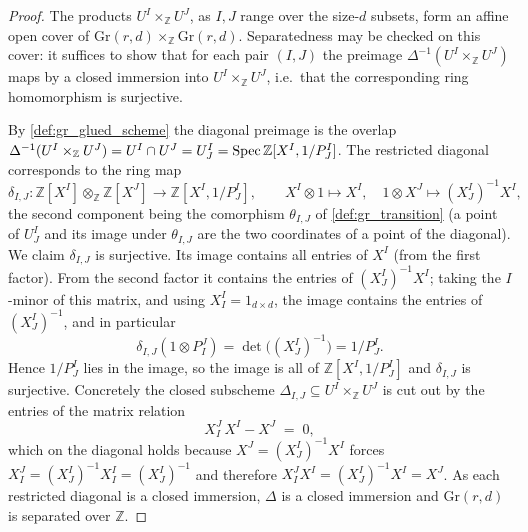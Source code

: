 \begin{proof}
  \leanok
  The products \(U^I \times_{\mathbb{Z}} U^J\), as \(I, J\) range over the
  size-\(d\) subsets, form an affine open cover of \(\mathrm{Gr}(r,d)
  \times_{\mathbb{Z}} \mathrm{Gr}(r,d)\). Separatedness may be checked on this
  cover: it suffices to show that for each pair \((I,J)\) the preimage
  \(\Delta^{-1}(U^I \times_{\mathbb{Z}} U^J)\) maps by a closed immersion into
  \(U^I \times_{\mathbb{Z}} U^J\), i.e.\ that the corresponding ring
  homomorphism is surjective.

  By \cref{def:gr_glued_scheme} the diagonal preimage is the overlap
  \(\Delta^{-1}(U^I \times_{\mathbb{Z}} U^J) = U^I \cap U^J = U^I_J = \operatorname{Spec}
  \mathbb{Z}[X^I, 1/P^I_J]\). The restricted diagonal corresponds to the ring map
  \[
    \delta_{I,J} : \mathbb{Z}[X^I] \otimes_{\mathbb{Z}} \mathbb{Z}[X^J]
    \longrightarrow \mathbb{Z}[X^I, 1/P^I_J],
    \qquad
    X^I \otimes 1 \mapsto X^I, \quad 1 \otimes X^J \mapsto (X^I_J)^{-1} X^I,
  \]
  the second component being the comorphism \(\theta_{I,J}\) of
  \cref{def:gr_transition} (a point of \(U^I_J\) and its image under
  \(\theta_{I,J}\) are the two coordinates of a point of the diagonal). We claim
  \(\delta_{I,J}\) is surjective. Its image contains all entries of \(X^I\)
  (from the first factor). From the second factor it contains the entries of
  \((X^I_J)^{-1} X^I\); taking the \(I\)-minor of this matrix, and using
  \(X^I_I = 1_{d\times d}\), the image contains the entries of \((X^I_J)^{-1}\),
  and in particular
  \[
    \delta_{I,J}(1 \otimes P^J_I) = \det\bigl((X^I_J)^{-1}\bigr) = 1/P^I_J .
  \]
  Hence \(1/P^I_J\) lies in the image, so the image is all of
  \(\mathbb{Z}[X^I, 1/P^I_J]\) and \(\delta_{I,J}\) is surjective. Concretely the
  closed subscheme \(\Delta_{I,J} \subseteq U^I \times_{\mathbb{Z}} U^J\) is cut
  out by the entries of the matrix relation
  \[
    X^J_I \, X^I - X^J \;=\; 0,
  \]
  which on the diagonal holds because \(X^J = (X^I_J)^{-1} X^I\) forces
  \(X^J_I = (X^I_J)^{-1} X^I_I = (X^I_J)^{-1}\) and therefore \(X^J_I X^I =
  (X^I_J)^{-1} X^I = X^J\). As each restricted diagonal is a closed immersion,
  \(\Delta\) is a closed immersion and \(\mathrm{Gr}(r,d)\) is separated over
  \(\mathbb{Z}\).
\end{proof}

